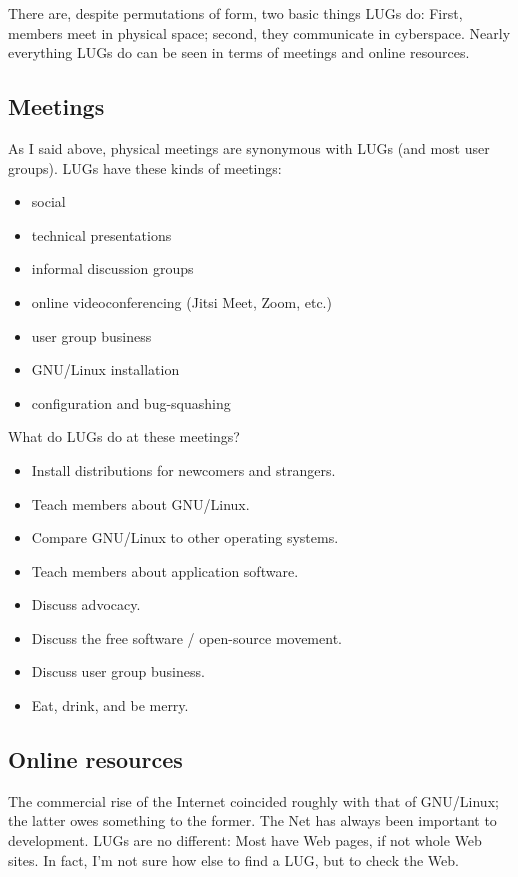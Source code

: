 \documentclass{HOWTO}
\begin{document}
There are, despite permutations of form, two basic things LUGs do:
First, members meet in physical space; second, they communicate
in cyberspace. Nearly everything LUGs do can be seen in terms of
meetings and online resources.




\subsection{Meetings}

As I said above, physical meetings are synonymous with LUGs (and 
most user groups).  LUGs have these kinds of meetings:

\begin{itemize}
\item social
\item technical presentations
\item informal discussion groups
\item online videoconferencing (Jitsi Meet, Zoom, etc.)
\item user group business
\item GNU/Linux installation
\item configuration and bug-squashing
\end{itemize}


What do LUGs do at these meetings?

\begin{itemize}
\item Install distributions for newcomers and strangers.
\item Teach members about GNU/Linux.
\item Compare GNU/Linux to other operating systems.
\item Teach members about application software.
\item Discuss advocacy.
\item Discuss the free software / open-source movement.
\item Discuss user group business.
\item Eat, drink, and be merry.
\end{itemize}







\subsection{Online resources}

The commercial rise of the Internet coincided roughly with that of
GNU/Linux; the latter owes something to the former. The Net has always been
important to development. LUGs are no different: Most have Web
pages, if not whole Web sites. In fact, I'm not sure how else to find a
LUG, but to check the Web.  
\end{document}
